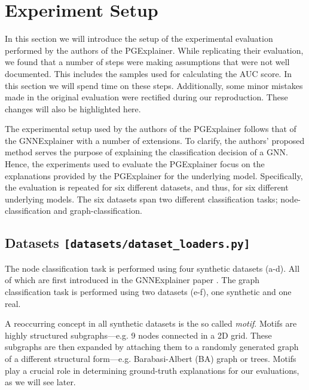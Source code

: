 \section{Experiment Setup}\label{sec:replication} 
In this section we will introduce the setup of the experimental evaluation performed by the authors of the PGExplainer. While replicating their evaluation, we found that a number of steps were making assumptions that were not well documented. This includes the samples used for calculating the AUC score. In this section we will spend time on these steps. Additionally, some minor mistakes made in the original evaluation were rectified during our reproduction. These changes will also be highlighted here.

The experimental setup used by the authors of the PGExplainer follows that of the GNNExplainer \cite{ying2019gnnexplainer} with a number of extensions. To clarify, the authors' proposed method serves the purpose of explaining the classification decision of a GNN. Hence, the experiments used to evaluate the PGExplainer focus on the explanations provided by the PGExplainer for the underlying model. Specifically, the evaluation is repeated for six different datasets, and thus, for six different underlying models. The six datasets span two different classification tasks; node-classification and graph-classification. 

\subsection{Datasets \hfill \texttt{[datasets/dataset\_loaders.py]}}\label{sec:datasets}
The node classification task is performed using four synthetic datasets (a-d). All of which are first introduced in the GNNExplainer paper \cite{ying2019gnnexplainer}. The graph classification task is performed using two datasets (e-f), one synthetic and one real.

A reoccurring concept in all synthetic datasets is the so called \textit{motif}. Motifs are highly structured subgraphs---e.g. 9 nodes connected in a 2D grid. These subgraphs are then expanded by attaching them to a randomly generated graph of a different structural form---e.g. Barabasi-Albert (BA) graph \cite{Barabasi99emergenceScaling} or trees. Motifs play a crucial role in determining ground-truth explanations for our evaluations, as we will see later.

